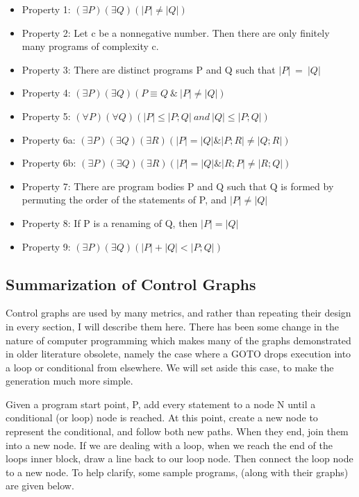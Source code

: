 \documentclass[]{article}
\begin{document}
\begin{itemize}
	\item Property 1: $(\exists P)(\exists Q)(|P|\neq |Q|)$
	\item Property 2: Let c be a nonnegative number. Then there
are only finitely many programs of complexity c.
	\item Property 3: There are distinct programs P and Q such
that $|P| ~= ~|Q|$
	\item Property 4: $(\exists P)(\exists Q)(P \equiv Q ~\& ~|P| \neq |Q|)$
	\item Property 5: $(\forall P)(\forall Q)(|P| \leq |P; Q| ~and ~|Q| \leq |P; Q|)$
	\item Property 6a: $(\exists P)(\exists Q)(\exists R)(|P| = |Q| \& |P;R| \neq |Q; R|)$
	\item Property 6b: $(\exists P)(\exists Q)(\exists R)(|P| = |Q| \& |R;P| \neq |R; Q|)$
	\item Property 7: There are program bodies P and Q such that Q is formed by permuting the order of the statements of P, and $|P| \neq |Q|$
	\item Property 8: If P is a renaming of Q, then $|P| = |Q|$
	\item Property 9: $(\exists P)(\exists Q)(|P|+|Q| < |P; Q|)$
\end{itemize}

\subsection{Summarization of Control Graphs}

Control graphs are used by many metrics, and rather than repeating their design in every section, I will describe them here. 
There has been some change in the nature of computer programming which makes many of the graphs demonstrated in older literature obsolete, namely the case where a GOTO drops execution into a loop or conditional from elsewhere.
We will set aside this case, to make the generation much more simple.

Given a program start point, P, add every statement to a node N until a conditional (or loop) node is reached.
At this point, create a new node to represent the conditional, and follow both new paths.
When they end, join them into a new node.
If we are dealing with a loop, when we reach the end of the loops inner block, draw a line back to our loop node. 
Then connect the loop node to a new node. 
To help clarify, some sample programs, (along with their graphs) are given below.
\end{document}
